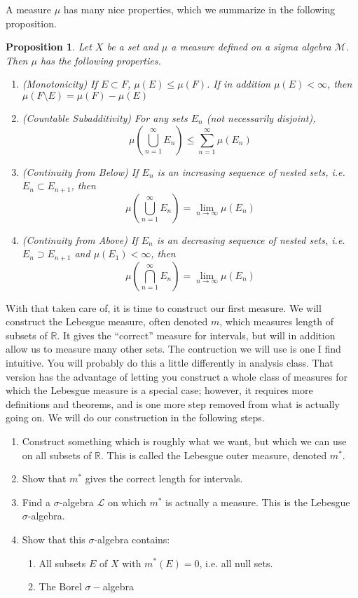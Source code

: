 \documentclass[12pt]{amsart}         %
\newtheorem{proposition}{Proposition}[section]
\theoremstyle{remark}
\newcommand{\R}{\mathbb{R}}
\begin{document}
A measure $\mu$ has many nice properties, which we summarize in the following proposition.

\begin{proposition}
Let $X$ be a set and $\mu$ a measure defined on a sigma algebra $\mathcal{M}$. Then $\mu$ has the following properties.
\begin{enumerate}
    \item (Monotonicity) If $E \subset F$, $\mu(E) \leq \mu(F)$. If in addition $\mu(E) < \infty$, then $\mu(F\setminus E) = \mu(F) - \mu(E)$
    \item (Countable Subadditivity) For any sets $E_n$ (not necessarily disjoint), 
    \[
    \mu\left( \bigcup_{n=1}^\infty E_n \right) \leq \sum_{n=1}^\infty \mu(E_n)
    \]
    \item (Continuity from Below) If $E_n$ is an increasing sequence of nested sets, i.e. $E_n \subset E_{n+1}$, then
    \[
    \mu\left( \bigcup_{n=1}^\infty E_n \right) = \lim_{n\rightarrow\infty} \mu(E_n)
    \]
    \item (Continuity from Above) If $E_n$ is an decreasing sequence of nested sets, i.e. $E_n \supset E_{n+1}$ and $\mu(E_1) < \infty$, then
    \[
    \mu\left( \bigcap_{n=1}^\infty E_n \right) = \lim_{n\rightarrow\infty} \mu(E_n)
    \]
\end{enumerate}
\end{proposition}

With that taken care of, it is time to construct our first measure. We will construct the Lebesgue measure, often denoted $m$, which measures length of subsets of $\R$. It gives the ``correct'' measure for intervals, but will in addition allow us to measure many other sets. The contruction we will use is one I find intuitive. You will probably do this a little differently in analysis class. That version has the advantage of letting you construct a whole class of measures for which the Lebesgue measure is a special case; however, it requires more definitions and theorems, and is one more step removed from what is actually going on. We will do our construction in the following steps.

\begin{enumerate}
    \item Construct something which is roughly what we want, but which we can use on all subsets of $\R$. This is called the Lebesgue outer measure, denoted $m^*$. 
    \item Show that $m^*$ gives the correct length for intervals.
    \item Find a $\sigma$-algebra $\mathcal{L}$ on which $m^*$ is actually a measure. This is the Lebesgue $\sigma$-algebra.
    \item Show that this $\sigma$-algebra contains:
    \begin{enumerate}
        \item All subsets $E$ of $X$ with $m^*(E) = 0$, i.e. all null sets.
        \item The Borel $\sigma-$algebra
    \end{enumerate}
\end{enumerate}
\end{document}
